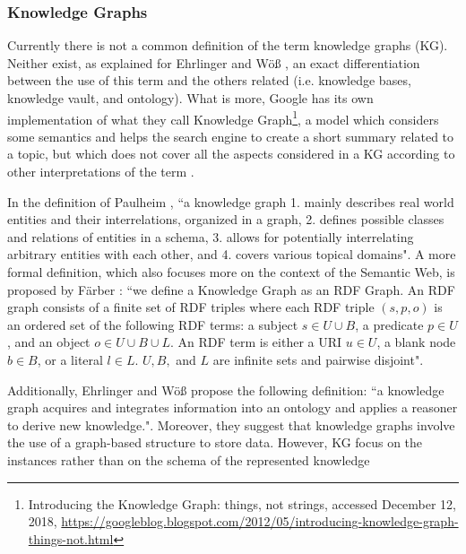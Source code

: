 \documentclass[runningheads]{llncs}
\begin{document}
\subsubsection{Knowledge Graphs} \label{knowledge-graphs}
Currently there is not a common definition of the term knowledge graphs (KG). Neither exist, as explained for Ehrlinger and W{\"o}{\ss} \cite{Ehrlinger}, an exact differentiation between the use of this term and the others related (i.e. knowledge bases, knowledge vault, and ontology). What is more, Google has its own implementation of what they call Knowledge Graph\footnote{Introducing the Knowledge Graph: things, not strings, accessed December 12, 2018,  \href{https://googleblog.blogspot.com/2012/05/introducing-knowledge-graph-things-not.html}{https://googleblog.blogspot.com/2012/05/introducing-knowledge-graph-things-not.html}}, a model which considers some semantics and helps the search engine to create a short summary related to a topic, but which does not cover all the aspects considered in a KG according to other interpretations of the term \cite{Ehrlinger}.

In the definition of Paulheim \cite{Paulheim}, ``a knowledge graph
1. mainly describes real world entities and their interrelations, organized in a graph, 2. defines possible classes and relations of entities in a schema, 3. allows for potentially interrelating arbitrary entities with each other, and 4. covers various topical domains". A more formal definition, which also focuses more on the context of the Semantic Web, is proposed by F{\"a}rber \cite{Farber}: ``we define a Knowledge Graph as an RDF Graph. An RDF graph consists of a finite set of RDF triples where each RDF triple $(s, p, o)$ is an ordered set of the following RDF terms: a subject $s \in U ∪ B$, a predicate $p \in U$, and an object $o \in U ∪ B ∪ L$. An RDF term is either a URI $u \in U$, a blank node $b \in B$, or a literal $l \in L$. $U, B,$ and $L$ are infinite sets and pairwise disjoint".

Additionally, Ehrlinger and W{\"o}{\ss} \cite{Ehrlinger} propose the following definition: ``a knowledge graph acquires and integrates information into an ontology and applies a reasoner to derive new knowledge.". Moreover, they suggest that knowledge graphs involve the use of a graph-based structure to store data. However, KG focus on the instances rather than on the schema of the represented knowledge \cite{Paulheim}
\end{document}

